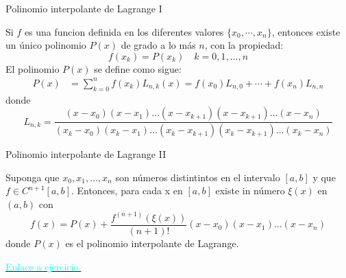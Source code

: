 \label{RetornoPolinomioLagrange}
\begin{frame}{Polinomio interpolante de Lagrange I}
\begin{Teo}
\indent Si $f$ es una funcion definida en los diferentes valores $\{x_0,\cdots, x_n\}$, entonces existe un único polinomio $P(x)$ de grado a lo más $n$, con la propiedad:
$$f(x_k)=P(x_k)\quad k=0, 1, \dots, n$$
El polinomio $P(x)$ se define como sigue:
\begin{align*}
P(x)&=\sum_{k=0}^{n}f(x_k)L_{n,k}(x)=f(x_0)L_{n,0}+\cdots+f(x_n)L_{n,n}
\end{align*}
donde
$$L_{n,k}=\frac{(x-x_0)(x-x_1)\dots(x-x_{k+1})(x-x_{k+1})\dots (x-x_n)}{(x_k-x_0)(x_k-x_1)\dots(x_k-x_{k+1})(x_k-x_{k+1})\dots (x_k-x_n)}$$
\end{Teo}
\end{frame}
\begin{frame}{Polinomio interpolante de Lagrange II}
\begin{Teo}
Suponga que $x_0, x_1, \dots, x_n$ son números distintintos en el intervalo $[a,b]$ y que $f \in C^{n+1}[a,b]$. Entonces, para cada x en $[a,b]$ existe in número $\xi(x)$ en $(a,b)$ con 
$$f(x)=P(x)+\frac{f^{(n+1)}(\xi(x))}{(n+1)!}(x-x_0)(x-x_1)\dots (x-x_n)$$
donde $P(x)$ es el polinomio interpolante de Lagrange.
\end{Teo}
\hyperlink{PolinomioLagrange}{\textcolor{cyan}{Enlace a ejercicio.}}
\end{frame}
